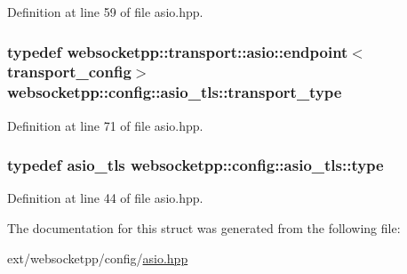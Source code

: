 Definition at line 59 of file asio.\+hpp.

\hypertarget{structwebsocketpp_1_1config_1_1asio__tls_ad261981514a31011420d9191ff9b80a8}{}
\subsubsection[{transport\+\_\+type}]{\setlength{\rightskip}{0pt plus 5cm}typedef {\bf websocketpp\+::transport\+::asio\+::endpoint}$<${\bf transport\+\_\+config}$>$ {\bf websocketpp\+::config\+::asio\+\_\+tls\+::transport\+\_\+type}}\label{structwebsocketpp_1_1config_1_1asio__tls_ad261981514a31011420d9191ff9b80a8}


Definition at line 71 of file asio.\+hpp.

\hypertarget{structwebsocketpp_1_1config_1_1asio__tls_a92b38c443d4d89c2acf4490e696e0810}{}
\subsubsection[{type}]{\setlength{\rightskip}{0pt plus 5cm}typedef {\bf asio\+\_\+tls} {\bf websocketpp\+::config\+::asio\+\_\+tls\+::type}}\label{structwebsocketpp_1_1config_1_1asio__tls_a92b38c443d4d89c2acf4490e696e0810}


Definition at line 44 of file asio.\+hpp.



The documentation for this struct was generated from the following file\+:\begin{DoxyCompactItemize}
\item 
ext/websocketpp/config/\hyperlink{websocketpp_2config_2asio_8hpp}{asio.\+hpp}\end{DoxyCompactItemize}
